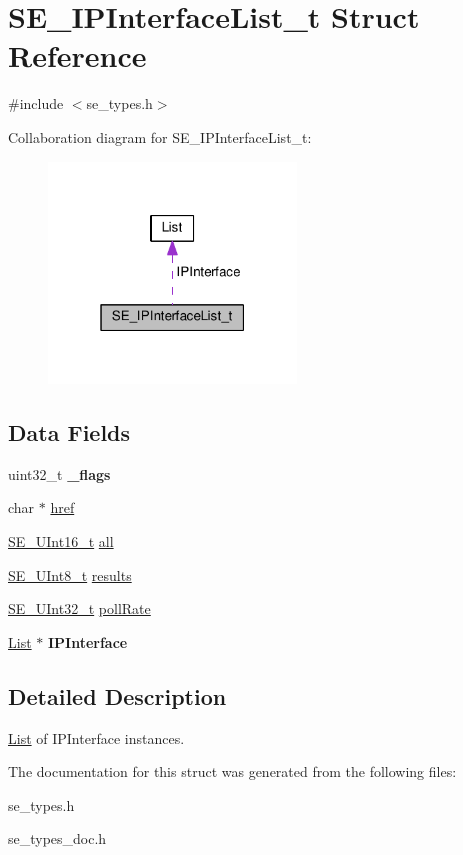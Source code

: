 \hypertarget{structSE__IPInterfaceList__t}{}\section{S\+E\+\_\+\+I\+P\+Interface\+List\+\_\+t Struct Reference}
\label{structSE__IPInterfaceList__t}


{\ttfamily \#include $<$se\+\_\+types.\+h$>$}



Collaboration diagram for S\+E\+\_\+\+I\+P\+Interface\+List\+\_\+t\+:\nopagebreak
\begin{figure}[H]
\begin{center}
\leavevmode
\includegraphics[width=187pt]{structSE__IPInterfaceList__t__coll__graph}
\end{center}
\end{figure}
\subsection*{Data Fields}
\begin{DoxyCompactItemize}
\item 
uint32\+\_\+t {\bfseries \+\_\+flags}
\item 
char $\ast$ \hyperlink{group__IPInterfaceList_ga8d2aa9f5037c9e3dd1c5f57574f18623}{href}
\item 
\hyperlink{group__UInt16_gac68d541f189538bfd30cfaa712d20d29}{S\+E\+\_\+\+U\+Int16\+\_\+t} \hyperlink{group__IPInterfaceList_ga7599acc849916884bf2ab40af9644c87}{all}
\item 
\hyperlink{group__UInt8_gaf7c365a1acfe204e3a67c16ed44572f5}{S\+E\+\_\+\+U\+Int8\+\_\+t} \hyperlink{group__IPInterfaceList_ga4ef447fb08fb976a9d26d9764d111abb}{results}
\item 
\hyperlink{group__UInt32_ga70bd4ecda3c0c85d20779d685a270cdb}{S\+E\+\_\+\+U\+Int32\+\_\+t} \hyperlink{group__IPInterfaceList_gacffb60f8d3c1549c12714eb33d91d745}{poll\+Rate}
\item 
\hyperlink{structList}{List} $\ast$ {\bfseries I\+P\+Interface}
\end{DoxyCompactItemize}


\subsection{Detailed Description}
\hyperlink{structList}{List} of I\+P\+Interface instances. 

The documentation for this struct was generated from the following files\+:\begin{DoxyCompactItemize}
\item 
se\+\_\+types.\+h\item 
se\+\_\+types\+\_\+doc.\+h\end{DoxyCompactItemize}

